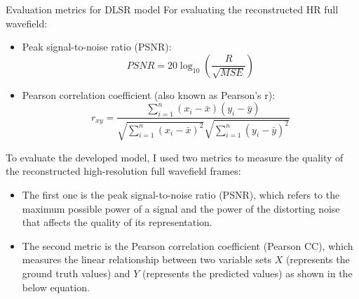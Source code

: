 \documentclass[10pt,aspectratio=169,dvipsnames]{beamer} %
\begin{document}
\setcounter{subfigure}{0}
\begin{frame}{Evaluation metrics for DLSR model}
	For evaluating the reconstructed HR full wavefield:
	\begin{itemize}
		\item Peak signal-to-noise ratio (PSNR):
		\begin{equation*}
			PSNR=20\log_{10}\left(\frac{R}{\sqrt{MSE}}\right)
			\label{PSNR_}
		\end{equation*}			
		\item Pearson correlation coefficient (also known as Pearson's r):
		\begin{equation*}
			r_{xy} = \frac{\sum_{i=1}^{n}(x_i - \bar{x})(y_i-\bar{y})}{\sqrt{\sum_{i=1}^{n}(x_i - \bar{x})^2}\sqrt{\sum_{i=1}^{n}(y_i - \bar{y})^2}}
			\label{Pearson_}
		\end{equation*}
	\end{itemize}
\end{frame}
\note
{
	To evaluate the developed model, I used two metrics to measure the quality of the reconstructed high-resolution full wavefield frames:
	\begin{itemize}
		\item The first one is the peak signal-to-noise ratio (PSNR), which refers to the maximum possible power of a signal and the power of the distorting noise that affects the quality of its representation.
		\item The second metric is the Pearson correlation coefficient (Pearson CC), which measures the linear relationship between two
		variable sets \(X\) (represents the ground truth values) and \(Y\) (represents the predicted values) as shown in the below equation.
		
	\end{itemize}
}
\setcounter{subfigure}{0}
\end{document}
